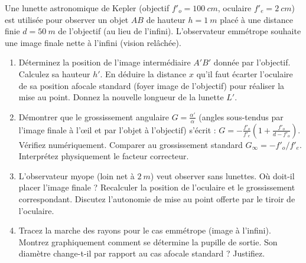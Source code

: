 \documentclass[11pt]{article}
\begin{document}
\begin{exercice}
Une lunette astronomique de Kepler (objectif $f'_o = \SI{100}{cm}$, oculaire $f'_e = \SI{2}{cm}$) est utilisée pour observer un objet $AB$ de hauteur $h = \SI{1}{m}$ placé à une distance finie $d = \SI{50}{m}$ de l'objectif (au lieu de l'infini). L'observateur emmétrope souhaite une image finale nette à l'infini (vision relâchée).
\begin{enumerate}
    \item Déterminez la position de l'image intermédiaire $A'B'$ donnée par l'objectif. Calculez sa hauteur $h'$. En déduire la distance $x$ qu'il faut écarter l'oculaire de sa position afocale standard (foyer image de l'objectif) pour réaliser la mise au point. Donnez la nouvelle longueur de la lunette $L'$.
    \item Démontrer que le grossissement angulaire $G = \frac{\alpha'}{\alpha}$ (angles sous-tendus par l'image finale à l'œil et par l'objet à l'objectif) s'écrit : $G = -\frac{f'_o}{f'_e}\left(1 + \frac{f'_o}{d - f'_o}\right)$. Vérifiez numériquement. Comparer au grossissement standard $G_\infty = -f'_o/f'_e$. Interprétez physiquement le facteur correcteur.
    \item L'observateur myope (loin net à $\SI{2}{m}$) veut observer sans lunettes. Où doit-il placer l'image finale ? Recalculer la position de l'oculaire et le grossissement correspondant. Discutez l'autonomie de mise au point offerte par le tiroir de l'oculaire.
    \item Tracez la marche des rayons pour le cas emmétrope (image à l'infini). Montrez graphiquement comment se détermine la pupille de sortie. Son diamètre change-t-il par rapport au cas afocale standard ? Justifiez.
\end{enumerate}
\end{exercice}
\end{document}
